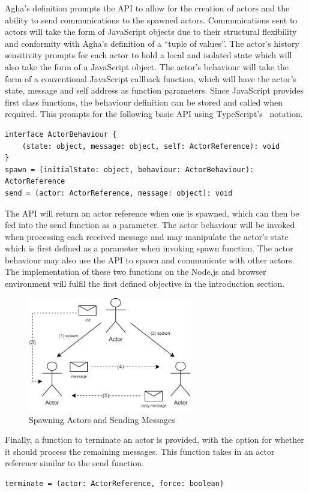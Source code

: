 \documentclass[12pt, a4paper]{report}
\theoremstyle{definition}
\theoremstyle{definition}%
\theoremstyle{definition}%
\theoremstyle{definition}%
\theoremstyle{definition}%
\theoremstyle{definition}%
\begin{document}
Agha's definition prompts the API to allow for the creation of actors and the ability to send communications to the spawned actors. Communications sent to actors will take the form of JavaScript objects due to their structural flexibility and conformity with Agha's definition of a “tuple of values”. The actor's history sensitivity prompts for each actor to hold a local and isolated state which will also take the form of a JavaScript object. The actor's behaviour will take the form of a conventional JavaScript callback function, which will have the actor's state, message and self address as function parameters. Since JavaScript provides first class functions, the behaviour definition can be stored and called when required. This prompts for the following basic API using TypeScript's~\cite{typescript} notation.
\begin{lstlisting}
interface ActorBehaviour {
    (state: object, message: object, self: ActorReference): void
}
spawn = (initialState: object, behaviour: ActorBehaviour): ActorReference
send = (actor: ActorReference, message: object): void    
\end{lstlisting}
The API will return an actor reference when one is spawned, which can then be fed into the send function as a parameter. The actor behaviour will be invoked when processing each received message and may manipulate the actor's state which is first defined as a parameter when invoking spawn function. The actor behaviour may also use the API to spawn and communicate with other actors. The implementation of these two functions on the Node.js and browser environment will fulfil the first defined objective in the introduction section. 
\begin{figure}[H]
    \begin{centering}
        \includegraphics[width=270px]{resources/actors.png}
        \caption{Spawning Actors and Sending Messages}
    \end{centering}
\end{figure}
Finally, a function to terminate an actor is provided, with the option for whether it should process the remaining messages. This function takes in an actor reference similar to the send function.
\begin{lstlisting}
terminate = (actor: ActorReference, force: boolean)
\end{lstlisting}
\end{document}
